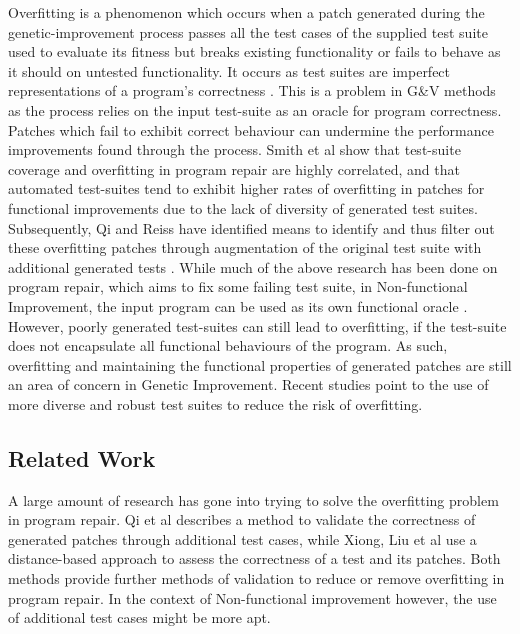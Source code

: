 \documentclass[titlepage]{article}
\begin{document}
Overfitting is a phenomenon which occurs when a patch generated during the genetic-improvement process passes all the test cases of the supplied test suite used to evaluate its fitness but breaks existing functionality or fails to behave as it should on untested functionality. It occurs as test suites are imperfect representations of a program’s correctness \cite{cure}. This is a problem in G\&V methods as the process relies on the input test-suite as an oracle for program correctness. Patches which fail to exhibit correct behaviour can undermine the performance improvements found through the process. Smith et al \cite{cure} show that test-suite coverage and overfitting in program repair are highly correlated, and that automated test-suites tend to exhibit higher rates of overfitting in patches for functional improvements due to the lack of diversity of generated test suites. Subsequently, Qi and Reiss \cite{qireiss2017} have identified means to identify and thus filter out these overfitting patches through augmentation of the original test suite with additional generated tests . While much of the above research has been done on program repair, which aims to fix some failing test suite, in Non-functional Improvement, the input program can be used as its own functional oracle \cite{petkegin}. However, poorly generated test-suites can still lead to overfitting, if the test-suite does not encapsulate all functional behaviours of the program. As such, overfitting and maintaining the functional properties of generated patches are still an area of concern in Genetic Improvement. Recent studies \cite{cure,yicorrelation} point to the use of more diverse and robust test suites to reduce the risk of overfitting.


\subsection{Related Work}

A large amount of research has gone into trying to solve the overfitting problem in program repair. Qi et al \cite{qireiss2017} describes a method to validate the correctness of generated patches through additional test cases, while Xiong, Liu et al \cite{xiongliu2018} use a distance-based approach to assess the correctness of a test and its patches. Both methods provide further methods of validation to reduce or remove overfitting in program repair. In the context of Non-functional improvement however, the use of additional test cases might be more apt.
\end{document}
